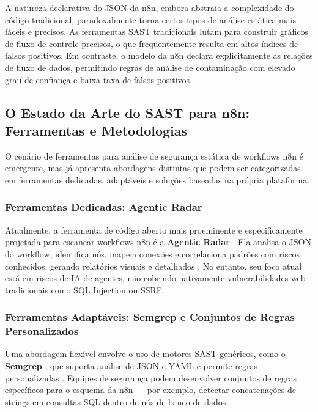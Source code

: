 \documentclass{sftex}
\begin{document}
A natureza declarativa do JSON da n8n, embora abstraia a complexidade do código tradicional, paradoxalmente torna certos tipos de análise estática mais fáceis e precisos. As ferramentas SAST tradicionais lutam para construir gráficos de fluxo de controle precisos, o que frequentemente resulta em altos índices de falsos positivos. Em contraste, o modelo da n8n declara explicitamente as relações de fluxo de dados, permitindo regras de análise de contaminação com elevado grau de confiança e baixa taxa de falsos positivos.

\subsection{O Estado da Arte do SAST para n8n: Ferramentas e Metodologias}

O cenário de ferramentas para análise de segurança estática de workflows n8n é emergente, mas já apresenta abordagens distintas que podem ser categorizadas em ferramentas dedicadas, adaptáveis e soluções baseadas na própria plataforma.

\subsubsection{Ferramentas Dedicadas: Agentic Radar}

Atualmente, a ferramenta de código aberto mais proeminente e especificamente projetada para escanear workflows n8n é a \textbf{Agentic Radar} \cite{splxai_n8n_scanning}. Ela analisa o JSON do workflow, identifica nós, mapeia conexões e correlaciona padrões com riscos conhecidos, gerando relatórios visuais e detalhados \cite{splxai_medium_scanning}. No entanto, seu foco atual está em riscos de IA de agentes, não cobrindo nativamente vulnerabilidades web tradicionais como SQL Injection ou SSRF.

\subsubsection{Ferramentas Adaptáveis: Semgrep e Conjuntos de Regras Personalizados}

Uma abordagem flexível envolve o uso de motores SAST genéricos, como o \textbf{Semgrep} \cite{semgrep_platform}, que suporta análise de JSON e YAML e permite regras personalizadas \cite{semgrep_custom_rules}. Equipes de segurança podem desenvolver conjuntos de regras específicos para o esquema da n8n — por exemplo, detectar concatenações de strings em consultas SQL dentro de nós de banco de dados.
\end{document}

